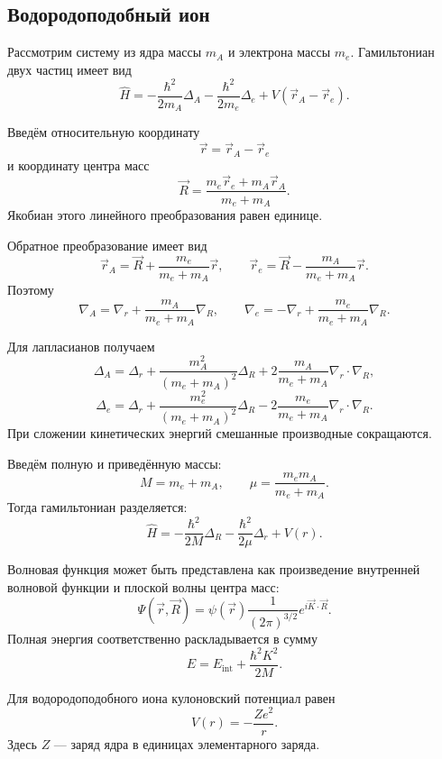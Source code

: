 \documentclass[12pt,a4paper]{article}
\begin{document}
\subsection{Водородоподобный ион}

Рассмотрим систему из ядра массы $m_A$ и электрона массы $m_e$.
Гамильтониан двух частиц имеет вид
\[
    \boxed{
    \hat H
    =
    -\frac{\hbar^2}{2m_A}\Delta_A
    -
    \frac{\hbar^2}{2m_e}\Delta_e
    +
    V(\vec r_A-\vec r_e)
    }.
\]

Введём относительную координату
\[
    \boxed{
        \vec r=\vec r_A-\vec r_e
    }
\]
и координату центра масс
\[
    \boxed{
        \vec R
        =
        \frac{
            m_e\vec r_e+m_A\vec r_A
        }{
            m_e+m_A
        }
    }.
\]
Якобиан этого линейного преобразования равен единице.

Обратное преобразование имеет вид
\[
    \vec r_A
    =
    \vec R+
    \frac{m_e}{m_e+m_A}\vec r,
    \qquad
    \vec r_e
    =
    \vec R-
    \frac{m_A}{m_e+m_A}\vec r.
\]
Поэтому
\[
    \nabla_A
    =
    \nabla_r+
    \frac{m_A}{m_e+m_A}\nabla_R,
    \qquad
    \nabla_e
    =
    -\nabla_r+
    \frac{m_e}{m_e+m_A}\nabla_R.
\]

Для лапласианов получаем
\[
    \Delta_A
    =
    \Delta_r
    +
    \frac{m_A^2}{(m_e+m_A)^2}\Delta_R
    +
    2\frac{m_A}{m_e+m_A}
    \nabla_r\!\cdot\nabla_R,
\]
\[
    \Delta_e
    =
    \Delta_r
    +
    \frac{m_e^2}{(m_e+m_A)^2}\Delta_R
    -
    2\frac{m_e}{m_e+m_A}
    \nabla_r\!\cdot\nabla_R.
\]
При сложении кинетических энергий смешанные производные сокращаются.

Введём полную и приведённую массы:
\[
    \boxed{
        M=m_e+m_A,
        \qquad
        \mu=
        \frac{m_em_A}{m_e+m_A}
    }.
\]
Тогда гамильтониан разделяется:
\[
    \boxed{
    \hat H
    =
    -\frac{\hbar^2}{2M}\Delta_R
    -
    \frac{\hbar^2}{2\mu}\Delta_r
    +
    V(r)
    }.
\]

Волновая функция может быть представлена как произведение внутренней
волновой функции и плоской волны центра масс:
\[
    \boxed{
    \Psi(\vec r,\vec R)
    =
    \psi(\vec r)
    \frac{1}{(2\pi)^{3/2}}
    e^{i\vec K\cdot\vec R}
    }.
\]
Полная энергия соответственно раскладывается в сумму
\[
    \boxed{
        E
        =
        E_{\mathrm{int}}
        +
        \frac{\hbar^2K^2}{2M}
    }.
\]

Для водородоподобного иона кулоновский потенциал равен
\[
    \boxed{
        V(r)=-\frac{Ze^2}{r}
    }.
\]
Здесь $Z$ --- заряд ядра в единицах элементарного заряда.
\end{document}
